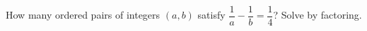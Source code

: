 How many ordered pairs of integers $(a,b)$ satisfy $\dfrac{1}{a}-\dfrac{1}{b}=\dfrac{1}{4}$? Solve by factoring.
